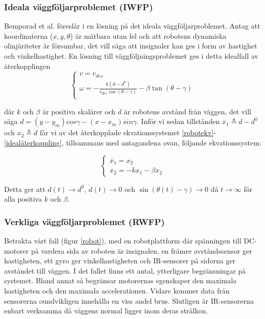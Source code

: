 \documentclass[11pt]{article}
\begin{document}
\begin{flushleft}
\subsubsection{Ideala väggföljarproblemet (IWFP)}
Bemporad et al. föreslår i \cite{wfp} en lösning på det ideala väggföljarproblemet. Antag att  koordinaterna (\(x, y, \theta\)) är mätbara utan fel och att robotens dynamiska olinjäriteter är försumbar, det vill säga att insignaler kan ges i form av hastighet och vinkelhastighet. En lösning till väggföljningsproblemet ges i detta idealfall av återkopplingen
\begin{equation}\label{idealåterkoppling}
	\begin{cases}
	v = v_{des} \\
	\omega = -\frac{k(d - d^0)}{v_{des} \cos (\theta - \gamma)} - \beta \tan (\theta - \gamma) \\
	\end{cases}
\end{equation}

där \(k\) och \(\beta\) är positiva skalärer och \(d\) är robotens avstånd från väggen, det vill säga \(d = (y - y_m)cos\gamma - (x - x_m)sin\gamma\). Inför vi sedan tillstånden \(x_1 \triangleq d - d^0\) och \(x_2 \triangleq \dot{d}\) får vi av det återkopplade ekvationssystemet \eqref{robotekv}-\eqref{idealåterkoppling}, tillsammans med antagandena ovan, följande ekvationssystem:

\begin{equation}
	\begin{cases}
	\dot{x_1} = x_2 \\
	\dot{x_2} = -kx_1 - \beta x_2
	\end{cases}
\end{equation}

Detta ger att \(d(t) \to d^0\), \(\dot{d}(t) \to 0\) och \(\sin (\theta(t) - \gamma) \to 0\) då $t \to \infty$ för alla positiva $k$ och $\beta$.

\subsubsection{Verkliga väggföljarproblemet (RWFP)}\label{rwfp}
Betrakta vårt fall (figur \ref{robot}), med en robotplattform där spänningen till DC-motorer på vardera sida av roboten är insignalen, en främre avståndssensor ger hastigheten, ett gyro ger vinkelhastigheten och IR-sensorer på sidorna ger avståndet till väggen. I det fallet finns ett antal, ytterligare begränsningar på systemet. Bland annat så begränsar motorernas egenskaper den maximala hastigheten och den maximala accelerationen. Vidare kommer data från sensorerna oundvikligen innehålla en viss andel brus. Slutligen är IR-sensorerna enbart verksamma då  väggens normal ligger inom deras strålkon.


\end{flushleft}
\end{document}

